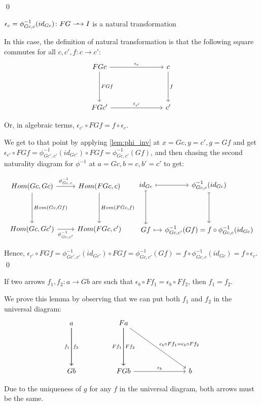 \documentclass[]{article}
\newcommand{\dotarrow}{%
	\mathrel{\ooalign{\hss\raise.65ex\hbox{\scalebox{1.25}{\normalfont .}}%
	\kern0.35ex\hss\cr$\longrightarrow$}}}
\begin{document}
\qed

\begin{lemma}{$\epsilon_c = \phi_{Gc,c}^{-1}(id_{Gc}) \colon FG \dotarrow I$ is a natural transformation}\label{lem:phi_inv_nat}
\end{lemma}
	
In this case, the definition of natural transformation is that the following square commutes for all $c, c', f \colon c \to c'$:
\[
\begin{tikzcd}
FG c \arrow[r, "\epsilon_c"] \arrow[d, "{FG f}"] 
&[50pt] c \arrow[d,"f"] \\[25pt]
FG c' \arrow[r, "\epsilon_{c'}"] & c'
\end{tikzcd}
\]

Or, in algebraic terms, $\epsilon_{c'} \circ FG f = f \circ \epsilon_c$.

We get to that point by applying \cref{lem:phi_inv} at $x = G c, y = c', g = G f$ and get $\epsilon_{c'} \circ FG f = \phi_{Gc',c'}^{-1}(id_{Gc'}) \circ FG f = \phi_{Gc,c'}^{-1}(G f)$, and then chasing the second naturality diagram for $\phi^{-1}$ at $a = Gc, b = c, b' = c'$ to get:

\[
\begin{tikzcd}
Hom(G c, G c) \arrow[r, "\phi_{Gc,c}^{-1}"] \arrow[d, "{Hom(Gc,Gf)}"] 
& Hom(FG c, c) \arrow[d,"{Hom(FG c,f)}"] \\[25pt]
Hom(G c, G c') \arrow[r, swap, "\phi_{Gc,c'}^{-1}"] & Hom(FG c, c')
\end{tikzcd}
\begin{tikzcd}
id_{Gc} \arrow[r,maps to] \arrow[d,maps to] &[-15pt] \phi^{-1}_{Gc,c} (id_{Gc}) \arrow[d, maps to] \\[25pt]
Gf \arrow[r, maps to] & \phi_{Gc,c'}^{-1} (Gf) = f \circ \phi_{Gc,c}^{-1}(id_{Gc})
\end{tikzcd}
\]

Hence, $\epsilon_{c'} \circ FG f = \phi_{Gc',c'}^{-1}(id_{Gc'}) \circ FG f = \phi_{Gc,c'}^{-1}(G f) = f \circ \phi_{Gc,c}^{-1}(id_{Gc}) =  f \circ \epsilon_c$. \qed

\begin{lemma}\label{lem:epsilon_unique}
	If two arrows $f_1,f_2 \colon a \to Gb$ are such that $\epsilon_b \circ Ff_1 = \epsilon_b \circ Ff_2$, then $f_1 = f_2$.
\end{lemma}
We prove this lemma by observing that we can put both $f_1$ and $f_2$ in the universal diagram:
\[
\begin{tikzcd}
a \arrow[d, "f_2"] \arrow[d, swap, "f_1"] &[25pt] F a \arrow[d, "Ff_2"] \arrow[d, swap, "Ff_1"] \arrow[rd, "\epsilon_b \circ Ff_1 = \epsilon_b \circ Ff_2"] \\[35pt] Gb & FGb \arrow[r, "\epsilon_{b}"] &[50pt] b
\end{tikzcd}
\]

Due to the uniqueness of $g$ for any $f$ in the universal diagram, both arrows must be the same.
\end{document}
